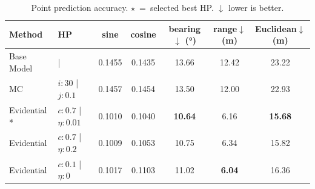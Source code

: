 \begin{table}[b]
\centering
\caption{Point prediction accuracy. $\star$~=~selected best HP. $\downarrow$ lower is better.}
\label{tab:accuracy}
\begin{tabular}{llccccc}
\toprule
Method & HP & sine & cosine & bearing$\downarrow$ (°) & range$\downarrow$ (m) & Euclidean$\downarrow$ (m) \\
\midrule
Base Model & | & 0.1455 & 0.1435 & 13.66 & 12.42 & 23.22 \\
MC \cite{gal2016dropout} & $i: 30$ | $j: 0.1$ & 0.1457 & 0.1454 & 13.50 & 12.00 & 22.93 \\
Evidential * & $c: 0.7$ | $\eta: 0.01$ & 0.1010 & 0.1040 & \textbf{10.64} & 6.16 & \textbf{15.68} \\
Evidential & $c: 0.7$ | $\eta: 0.2$ & 0.1009 & 0.1053 & 10.75 & 6.34 & 15.82 \\
Evidential & $c: 0.1$ | $\eta: 0$ & 0.1017 & 0.1103 & 11.02 & \textbf{6.04} & 16.36 \\
\bottomrule
\end{tabular}
\end{table}

